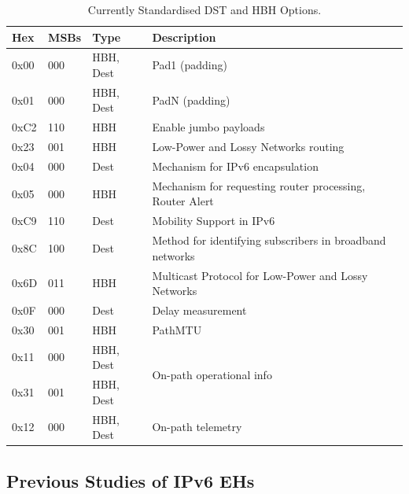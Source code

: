 \documentclass[conference]{IEEEtran}
\begin{document}
\begin{table}[b]
\center
\caption{Currently Standardised DST and HBH Options.}
\begin{tabular}{p{}|p{}|l|p{}}
Hex  & MSBs & Type      & Description                                              \\
\hline
\hline
0x00 & 000  & HBH, Dest & Pad1 (padding)                                           \\
0x01 & 000  & HBH, Dest & PadN (padding)                                           \\
0xC2 & 110  & HBH       & Enable jumbo payloads                                    \\
0x23 & 001  & HBH       & Low-Power and Lossy Networks routing                     \\
0x04 & 000  & Dest      & Mechanism for IPv6 encapsulation                 \\
0x05 & 000  & HBH       & Mechanism for requesting router processing, Router Alert              \\
0xC9 & 110  & Dest      & Mobility Support in IPv6                                 \\
0x8C & 100  & Dest      & Method for identifying subscribers in broadband networks \\
0x6D & 011  & HBH       & Multicast Protocol for Low-Power and  Lossy Networks     \\
0x0F & 000  & Dest      & Delay measurement                                        \\
0x30 & 001  & HBH       & PathMTU                                     \\
0x11 & 000  & HBH, Dest & \multirow{2}{*}{On-path operational info}                \\
0x31 & 001  & HBH, Dest &                                                          \\
0x12 & 000  & HBH, Dest & On-path telemetry                                       
\end{tabular}
  \label{tbl:options}
\end{table}


\subsection{Previous Studies of IPv6 EHs}

\label{sec:motivation}
\end{document}
